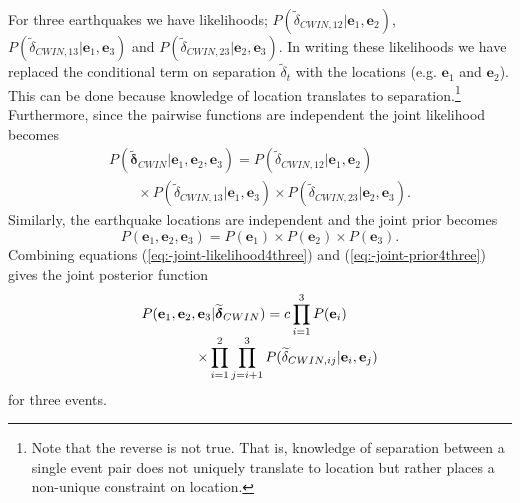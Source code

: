 \documentclass[extra, onecolumn, doublespacing]{gji}
\begin{document}
For three earthquakes we have likelihoods;
$P(\widetilde{\delta}_{CWIN,12}|\mathbf{e}_1, \mathbf{e}_2)$,
$P(\widetilde{\delta}_{CWIN,13}|\mathbf{e}_1, \mathbf{e}_3)$
and
$P(\widetilde{\delta}_{CWIN,23}|\mathbf{e}_2, \mathbf{e}_3)$.
In writing
these likelihoods we have replaced the conditional term on separation
$\widetilde{\delta}_t$ with the locations (e.g. $\mathbf{e}_1$ and $\mathbf{e}_2$).
This can be done because
knowledge of location translates to separation.\footnote{Note that the reverse is
not true. That is, knowledge of separation between a single event pair
does not uniquely translate to location but rather places a non-unique constraint on
location.}
Furthermore, since the pairwise functions are independent the joint
likelihood becomes
\begin{equation}
\begin{array}{l}
\label{eq:-joint-likelihood4three}
P(\widetilde{\mathbf{\delta}}_{CWIN} | \mathbf{e}_1, \mathbf{e}_2, \mathbf{e}_3) =
P(\widetilde{\delta}_{CWIN,12} | \mathbf{e}_1, \mathbf{e}_2) \\
\hspace{2em} \times P(\widetilde{\delta}_{CWIN,13} | \mathbf{e}_1, \mathbf{e}_3)
\times  P(\widetilde{\delta}_{CWIN,23} | \mathbf{e}_2, \mathbf{e}_3).
\end{array}
\end{equation}
Similarly, the earthquake locations are independent and the
joint prior becomes
\begin{equation}
\label{eq:-joint-prior4three} P(\mathbf{e}_1, \mathbf{e}_2,
\mathbf{e}_3) = P(\mathbf{e}_1) \times P(\mathbf{e}_2) \times
P(\mathbf{e}_3).
\end{equation}
Combining equations (\ref{eq:-joint-likelihood4three}) and
(\ref{eq:-joint-prior4three}) gives the joint posterior function
\begin{equation}
\label{eq-3eqposterior}
\begin{array}{l}
P(\mathbf{e}_1, \mathbf{e}_2, \mathbf{e}_3 | \widetilde{\mitbf{\delta}}_{CWIN}) = c \displaystyle \prod_{i=1}^3 P(\mathbf{e}_i) \\
\hspace{4em}  \times \displaystyle \prod_{i=1}^2 \prod_{j=i+1}^3
P(\widetilde{\delta}_{CWIN,ij}|\mathbf{e}_i,\mathbf{e}_j)
\end{array}
\end{equation}
for three events.
\end{document}
